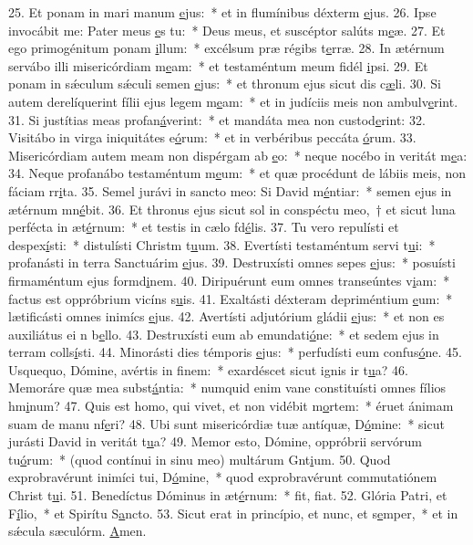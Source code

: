 25. Et ponam in mari manum \uline{e}jus:~* et in flumínibus déxterm \uline{e}jus.
26. Ipse invocábit me: Pater meus \uline{e}s tu:~* Deus meus, et suscéptor salúts m\uline{e}æ.
27. Et ego primogénitum ponam \uline{i}llum:~* excélsum præ régibs t\uline{e}rræ.
28. In ætérnum servábo illi misericórdiam m\uline{e}am:~* et testaméntum meum fidél \uline{i}psi.
29. Et ponam in sǽculum sǽculi semen \uline{e}jus:~* et thronum ejus sicut dis c\uline{æ}li.
30. Si autem derelíquerint fílii ejus legem m\uline{e}am:~* et in judíciis meis non ambulv\uline{e}rint.
31. Si justítias meas profan\uline{á}verint:~* et mandáta mea non custod\uline{e}rint:
32. Visitábo in virga iniquitátes e\uline{ó}rum:~* et in verbéribus peccáta \uline{ó}rum.
33. Misericórdiam autem meam non dispérgam ab \uline{e}o:~* neque nocébo in veritát m\uline{e}a:
34. Neque profanábo testaméntum m\uline{e}um:~* et quæ procédunt de lábiis meis, non fáciam rr\uline{i}ta.
35. Semel jurávi in sancto meo: Si David m\uline{é}ntiar:~* semen ejus in ætérnum mn\uline{é}bit.
36. Et thronus ejus sicut sol in conspéctu meo,~† et sicut luna perfécta in æt\uline{é}rnum:~* et testis in cælo fd\uline{é}lis.
37. Tu vero repulísti et despex\uline{í}sti:~* distulísti Christm t\uline{u}um.
38. Evertísti testaméntum servi t\uline{u}i:~* profanásti in terra Sanctuárim \uline{e}jus.
39. Destruxísti omnes sepes \uline{e}jus:~* posuísti firmaméntum ejus formd\uline{i}nem.
40. Diripuérunt eum omnes transeúntes v\uline{i}am:~* factus est oppróbrium vicíns s\uline{u}is.
41. Exaltásti déxteram depriméntium \uline{e}um:~* lætificásti omnes inimícs \uline{e}jus.
42. Avertísti adjutórium gládii \uline{e}jus:~* et non es auxiliátus ei n b\uline{e}llo.
43. Destruxísti eum ab emundati\uline{ó}ne:~* et sedem ejus in terram colls\uline{í}sti.
44. Minorásti dies témporis \uline{e}jus:~* perfudísti eum confus\uline{ó}ne.
45. Usquequo, Dómine, avértis in f\uline{i}nem:~* exardéscet sicut ignis ir t\uline{u}a?
46. Memoráre quæ mea subst\uline{á}ntia:~* numquid enim vane constituísti omnes fílios hm\uline{i}num?
47. Quis est homo, qui vivet, et non vidébit m\uline{o}rtem:~* éruet ánimam suam de manu nf\uline{e}ri?
48. Ubi sunt misericórdiæ tuæ antíquæ, D\uline{ó}mine:~* sicut jurásti David in veritát t\uline{u}a?
49. Memor esto, Dómine, oppróbrii servórum tu\uline{ó}rum:~* (quod contínui in sinu meo) multárum Gnt\uline{i}um.
50. Quod exprobravérunt inimíci tui, D\uline{ó}mine,~* quod exprobravérunt commutatiónem Christ t\uline{u}i.
51. Benedíctus Dóminus in æt\uline{é}rnum:~* fit, f\uline{i}at.
52. Glória Patri, et F\uline{í}lio,~* et Spirítu S\uline{a}ncto.
53. Sicut erat in princípio, et nunc, et s\uline{e}mper,~* et in sǽcula sæculórm. \uline{A}men.
